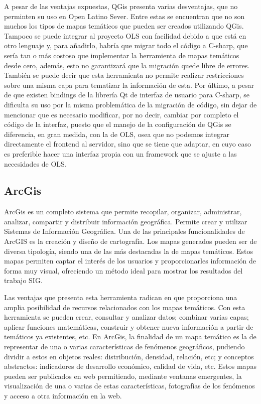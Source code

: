 A pesar de las ventajas expuestas, QGis presenta varias desventajas, que no perminten su uso en Open Latino Sever. Entre estas se encuentran que no son muchos los tipos de mapas tem\'aticos que pueden ser creados utilizando QGis. Tampoco se puede integrar al proyecto OLS con facilidad debido a que est\'a en otro lenguaje y, para a\~nadirlo, habr\'ia que migrar todo el c\'odigo a C-sharp, que ser\'ia tan o m\'as costoso que implementar la herramienta de mapas tem\'aticos desde cero, adem\'as, esto no garantizar\'a que la migraci\'on quede libre de errores. Tambi\'en se puede decir que esta herramienta no permite realizar restricciones sobre una misma capa para tematizar la informaci\'on de esta. Por \'ultimo, a pesar de que existen bindings de la librer\'ia Qt de interfaz de usuario para C-sharp, se dificulta su uso por la misma problem\'atica de la migraci\'on de c\'odigo, sin dejar de mencionar que es necesario modificar, por no decir, cambiar por completo el c\'odigo de la interfaz, puesto que el manejo de la configuraci\'on de QGis se diferencia, en gran medida, con la de OLS, osea que no podemos integrar directamente el frontend al servidor, sino que se tiene que adaptar, en cuyo caso es preferible hacer una interfaz propia con un framework que se ajuste a las necesidades de OLS.


\subsection{ArcGis}
ArcGis es un completo sistema que permite recopilar, organizar, administrar, analizar, compartir y distribuir informaci\'on geogr\'afica. Permite crear y utilizar Sistemas de Informaci\'on Geogr\'afica. Una de las principales funcionalidades de ArcGIS es la creaci\'on y dise\~no de cartograf\'ia. Los mapas generados pueden ser de diversa tipolog\'ia, siendo una de las m\'as destacadas la de mapas tem\'aticos. Estos mapas permiten captar el inter\'es de los usuarios y proporcionarles informaci\'on de forma muy visual, ofreciendo un m\'etodo ideal para mostrar los resultados del trabajo SIG.

Las ventajas que presenta esta herramienta radican en que proporciona una amplia posibilidad de recursos relacionados con los mapas tem\'aticos. Con esta herramienta se pueden crear, consultar y analizar datos; combinar varias capas; aplicar funciones matem\'aticas, construir y obtener nueva informaci\'on a partir de tem\'aticos ya existentes, etc. En ArcGis, la finalidad de un mapa tem\'atico es la de representar de una o varias caracter\'isticas de fen\'omenos geogr\'aficos, pudiendo dividir a estos en objetos reales: distribuci\'on, densidad, relaci\'on, etc; y conceptos abstractos: indicadores de desarrollo econ\'omico, calidad de vida, etc. Estos mapas pueden ser publicados en web permitiendo, mediante ventanas emergentes, la visualizaci\'on de una o varias de estas caracter\'isticas,  fotograf\'ias de los fen\'omenos y acceso a otra informaci\'on en la web.

